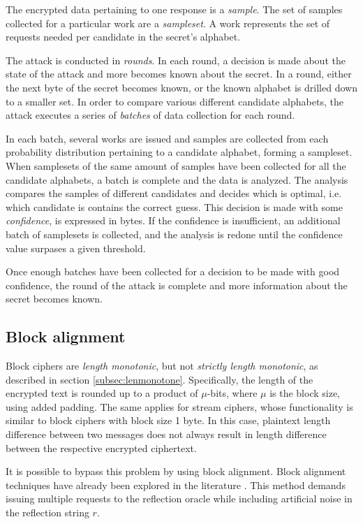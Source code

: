 \documentclass[conference, letterpaper, 10pt]{IEEEtran}
\begin{document}
The encrypted data pertaining to one response is a \textit{sample}.  The set of
samples collected for a particular work are a \textit{sampleset}. A work
represents the set of requests needed per candidate in the secret's alphabet.

The attack is conducted in \textit{rounds}. In each round, a decision is made
about the state of the attack and more becomes known about the secret. In a
round, either the next byte of the secret becomes known, or the known alphabet
is drilled down to a smaller set. In order to compare various different
candidate alphabets, the attack executes a series of \textit{batches} of data
collection for each round.

In each batch, several works are issued and samples are collected from each probability distribution
pertaining to a candidate alphabet, forming a sampleset. When samplesets of the
same amount of samples have been collected for all the candidate alphabets,
a batch is complete and the data is analyzed. The analysis compares the samples
of different candidates and decides which is optimal, i.e. which candidate is
contains the correct guess. This decision is made with some \textit{confidence},
is expressed in bytes. If the confidence is insufficient, an additional
batch of samplesets is collected, and the analysis is redone until the
confidence value surpases a given threshold.

Once enough batches have been collected for a decision to be made with good
confidence, the round of the attack is complete and more information about the
secret becomes known.

\subsection{Block alignment}\label{subsec:blockalign}
Block ciphers are \textit{length monotonic}, but not \textit{strictly length
monotonic}, as described in section \ref{subsec:lenmonotone}. Specifically, the
length of the encrypted text is rounded up to a product of $\mu$-bits, where $\mu$
is the block size, using added padding. The same applies for stream ciphers,
whose functionality is similar to block ciphers with block size 1 byte. In this
case, plaintext length difference between two messages does not always result in
length difference between the respective encrypted ciphertext.

It is possible to bypass this problem by using block alignment. Block alignment
techniques have already been explored in the literature \cite{c10}. This method
demands issuing multiple requests to the reflection oracle while including
artificial noise in the reflection string $r$.
\end{document}
